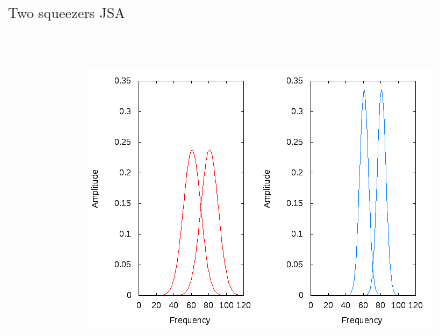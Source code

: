 \documentclass{beamer}
\begin{document}
\begin{frame}{Two squeezers JSA} 
    \begin{figure}
        \centering
        \begin{subfigure}{0.45\textwidth}
        \end{subfigure}
        ~
        \begin{subfigure}{0.45\textwidth}
        \includegraphics[width=1\textwidth]{single_sig_idler12.png}
    \end{subfigure}
   \end{figure}

\end{frame} 
\end{document}

